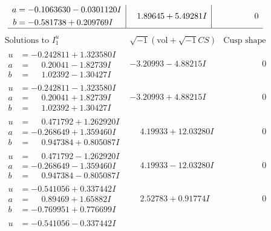 \documentclass[1p]{elsarticle_modified}
\theoremstyle{definition}
\newcommand{\I}{\sqrt{-1}}
\begin{document}
$$\begin{array}{c|c|c}
\begin{aligned}
a &= -0.1063630 - 0.0301120 I \\
b &= -0.581738 + 0.209769 I\end{aligned}
 & \phantom{-}1.89645 + 5.49281 I & \phantom{-0.000000 } 0\\
 \hline 
 \end{array}$$\newpage$$\begin{array}{c|c|c}  
\text{Solutions to }I^u_{1}& \I (\text{vol} + \sqrt{-1}CS) & \text{Cusp shape}\\
 \hline 
\begin{aligned}
u &= -0.242811 + 1.323580 I \\
a &= \phantom{-}0.20041 - 1.82739 I \\
b &= \phantom{-}1.02392 - 1.30427 I\end{aligned}
 & -3.20993 - 4.88215 I & \phantom{-0.000000 } 0 \\ \hline\begin{aligned}
u &= -0.242811 - 1.323580 I \\
a &= \phantom{-}0.20041 + 1.82739 I \\
b &= \phantom{-}1.02392 + 1.30427 I\end{aligned}
 & -3.20993 + 4.88215 I & \phantom{-0.000000 } 0 \\ \hline\begin{aligned}
u &= \phantom{-}0.471792 + 1.262920 I \\
a &= -0.268649 + 1.359460 I \\
b &= \phantom{-}0.947384 + 0.805087 I\end{aligned}
 & \phantom{-}4.19933 + 12.03280 I & \phantom{-0.000000 } 0 \\ \hline\begin{aligned}
u &= \phantom{-}0.471792 - 1.262920 I \\
a &= -0.268649 - 1.359460 I \\
b &= \phantom{-}0.947384 - 0.805087 I\end{aligned}
 & \phantom{-}4.19933 - 12.03280 I & \phantom{-0.000000 } 0 \\ \hline\begin{aligned}
u &= -0.541056 + 0.337442 I \\
a &= \phantom{-}0.89469 + 1.65882 I \\
b &= -0.769951 + 0.776699 I\end{aligned}
 & \phantom{-}2.52783 + 0.91774 I & \phantom{-0.000000 } 0 \\ \hline\begin{aligned}
u &= -0.541056 - 0.337442 I \\

\end{aligned}
\end{array}$$
\end{document}
